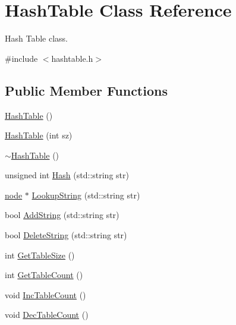\hypertarget{classHashTable}{\section{Hash\-Table Class Reference}
\label{classHashTable}
}


Hash Table class.  




{\ttfamily \#include $<$hashtable.\-h$>$}

\subsection*{Public Member Functions}
\begin{DoxyCompactItemize}
\item 
\hyperlink{classHashTable_adc3bf2b214c572819ba957ad314d7db3}{Hash\-Table} ()
\item 
\hyperlink{classHashTable_ad34603ecbe631c2609cf8bf6eb0e4234}{Hash\-Table} (int sz)
\item 
\hyperlink{classHashTable_a9ce5569bb945880cacb29aaba6f3e3f9}{$\sim$\-Hash\-Table} ()
\item 
unsigned int \hyperlink{classHashTable_af9de52d84a6f01768c1df4c228ae2b68}{Hash} (std\-::string str)
\item 
\hyperlink{structnode}{node} $\ast$ \hyperlink{classHashTable_a74b073c516dc278f73d08a4ea96cca77}{Lookup\-String} (std\-::string str)
\item 
bool \hyperlink{classHashTable_aa434d220762650368342c0b359537c13}{Add\-String} (std\-::string str)
\item 
bool \hyperlink{classHashTable_aeac528624c0abb98d25195c931087653}{Delete\-String} (std\-::string str)
\item 
int \hyperlink{classHashTable_a685b9fc2d98808166718fd3f7cbd0f5e}{Get\-Table\-Size} ()
\item 
int \hyperlink{classHashTable_a9c1d6c48eb05f677330cfba9cb8d30cf}{Get\-Table\-Count} ()
\item 
void \hyperlink{classHashTable_a2e806d467ac21b1392e67a215d904d17}{Inc\-Table\-Count} ()
\item 
void \hyperlink{classHashTable_ad364771e1ce21e952749cfa1668bb648}{Dec\-Table\-Count} ()
\end{DoxyCompactItemize}

